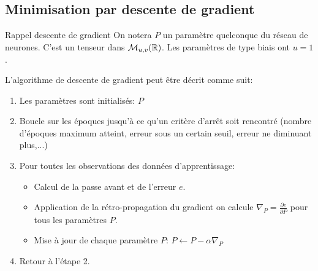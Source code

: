 \subsection[Minimisation par descente de gradient]{Minimisation par descente de gradient}

\begin{frame}{Rappel descente de gradient}
	On notera $P$ un paramètre quelconque du réseau de neurones. C'est un tenseur dans $\mathcal{M}_{u,v}(\mathbb{R})$. Les paramètres de type biais ont $u = 1$.
	
	\vspace{0.3cm}
	\pause
	
	L'algorithme de descente de gradient peut être décrit comme suit:
	\begin{enumerate}
		\item Les paramètres sont initialisés: $P$
		\pause
		\item Boucle sur les époques jusqu'à ce qu'un critère d'arrêt soit rencontré (nombre d'époques maximum atteint, erreur sous un certain seuil, erreur ne diminuant plus,...)
		\pause
		\item Pour toutes les observations des données d'apprentissage:
		\begin{itemize}
			\item Calcul de la passe avant et de l'erreur $e$.
			\pause
			\item Application de la rétro-propagation du gradient on calcule $\nabla_P = \frac{\partial{e}}{\partial{P}}$ pour tous les paramètres $P$.
			\pause
			\item Mise à jour de chaque paramètre $P$: $P \leftarrow P - \alpha \nabla_P$
		\end{itemize}
		\item Retour à l'étape 2.		
	\end{enumerate}
\end{frame}

